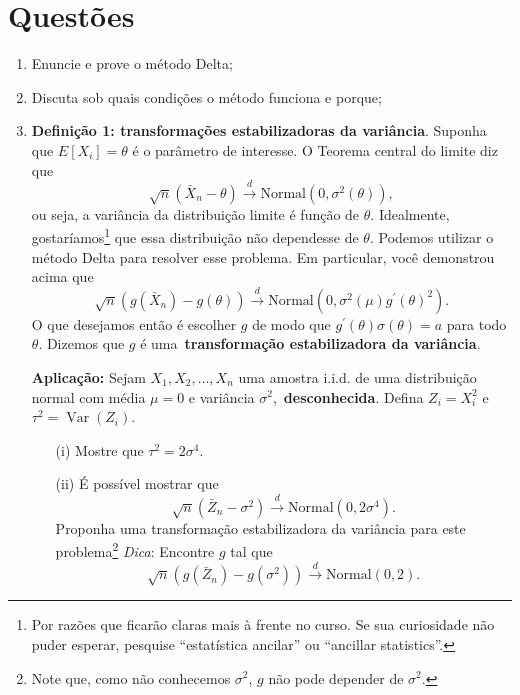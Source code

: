 \documentclass[a4paper,10pt, notitlepage]{report}
\begin{document}
\section*{Questões}
\begin{enumerate}
 \item Enuncie e prove o método Delta;
 \item Discuta sob quais condições o método funciona e porque;
 \item \textbf{Definição 1: transformações estabilizadoras da variância}.
 Suponha que $E[X_i] = \theta$ é o parâmetro de interesse. 
 O Teorema central do limite diz que
 \begin{equation}
  \sqrt{n}\left(\bar{X}_n - \theta \right) \xrightarrow{d} \textrm{Normal}\left(0, \sigma^2(\theta)\right),
 \end{equation}
ou seja, a variância da distribuição limite é função de $\theta$.
Idealmente, gostaríamos\footnote{Por razões que ficarão claras mais à frente no curso.
Se sua curiosidade não puder esperar, pesquise ``estatística ancilar'' ou ``ancillar statistics''.} que essa distribuição não dependesse de $\theta$.
Podemos utilizar o método Delta para resolver esse problema.
Em particular, você demonstrou acima que
\begin{equation}
 \sqrt{n}\left(g(\bar{X}_n) - g(\theta) \right) \xrightarrow{d} \textrm{Normal}\left(0, \sigma^2(\mu)g^\prime(\theta)^2\right).
\end{equation}
O que desejamos então é escolher $g$ de modo que $g^\prime(\theta)\sigma(\theta) = a$ para todo $\theta$.
Dizemos que $g$ é uma~\textbf{transformação estabilizadora da variância}.

\textbf{Aplicação:} Sejam $X_1, X_2, \ldots, X_n$ uma amostra i.i.d. de uma distribuição normal com média $\mu = 0$ e variância $\sigma^2$,~\textbf{desconhecida}.
Defina $Z_i = X_i^2$ e $\tau^2 = \operatorname{Var}(Z_i)$.
\begin{itemize}
 \item[(i)] Mostre que $\tau^2 = 2\sigma^4$.
 \item[(ii)] É possível mostrar que 
 \begin{equation}
 \sqrt{n}\left(\bar{Z}_n - \sigma^2 \right) \xrightarrow{d} \textrm{Normal}\left(0, 2\sigma^4\right).
\end{equation}
Proponha uma transformação estabilizadora da variância para este problema\footnote{Note que, como não conhecemos $\sigma^2$, $g$ não pode depender de $\sigma^2$.}
\textit{Dica}: Encontre $g$ tal que 
 \begin{equation*}
 \sqrt{n}\left(g(\bar{Z}_n) - g(\sigma^2) \right) \xrightarrow{d} \textrm{Normal}\left(0, 2\right).
\end{equation*}
\end{itemize}
\end{enumerate}



\end{document}

